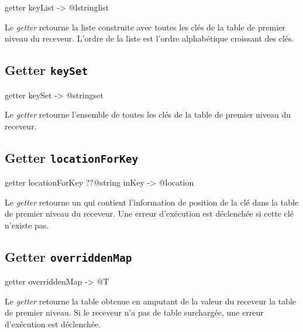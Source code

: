\begin{galgascode}
getter keyList -> @lstringlist
\end{galgascode}


Le \emph{getter}  retourne la liste construite avec toutes les clés de la table de premier niveau du receveur. L'ordre de la liste est l'ordre alphabétique croissant des clés.



\subsection{Getter \texttt{keySet}}

\begin{galgascode}
getter keySet -> @stringset
\end{galgascode}


Le \emph{getter}  retourne l'ensemble de toutes les clés de la table de premier niveau du receveur.





\subsection{Getter \texttt{locationForKey}}

\begin{galgascode}
getter locationForKey ??@string inKey -> @location
\end{galgascode}


Le \emph{getter}  retourne un  qui contient l'information de position de la clé  dans la table de premier niveau du receveur. Une erreur d'exécution est déclenchée si cette clé n'existe pas.








\subsection{Getter \texttt{overriddenMap}}

\begin{galgascode}
getter overriddenMap -> @T
\end{galgascode}


Le \emph{getter}  retourne la table obtenue en amputant de la valeur du receveur la table de premier niveau. Si le receveur n'a pas de table surchargée, une erreur d'exécution est déclenchée.





